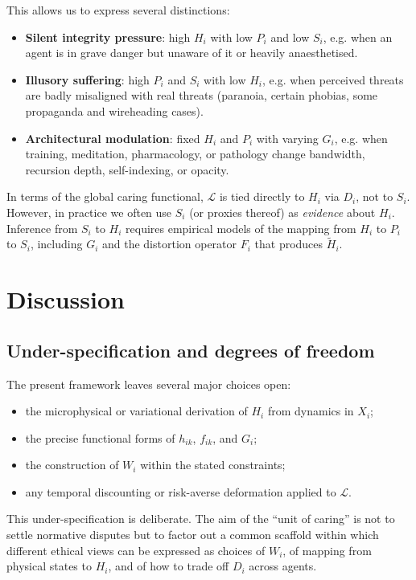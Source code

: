 \documentclass[11pt]{article}
\begin{document}
This allows us to express several distinctions:
\begin{itemize}
  \item \textbf{Silent integrity pressure}: high $H_i$ with low $P_i$ and low $S_i$, e.g. when an agent is in grave danger but unaware of it or heavily anaesthetised.
  \item \textbf{Illusory suffering}: high $P_i$ and $S_i$ with low $H_i$, e.g. when perceived threats are badly misaligned with real threats (paranoia, certain phobias, some propaganda and wireheading cases).
  \item \textbf{Architectural modulation}: fixed $H_i$ and $P_i$ with varying $G_i$, e.g. when training, meditation, pharmacology, or pathology change bandwidth, recursion depth, self-indexing, or opacity.
\end{itemize}

In terms of the global caring functional, $\mathcal L$ is tied directly to $H_i$ via $D_i$, not to $S_i$. However, in practice we often use $S_i$ (or proxies thereof) as \emph{evidence} about $H_i$. Inference from $S_i$ to $H_i$ requires empirical models of the mapping from $H_i$ to $P_i$ to $S_i$, including $G_i$ and the distortion operator $F_i$ that produces $\tilde H_i$.

\section{Discussion}

\subsection{Under-specification and degrees of freedom}

The present framework leaves several major choices open:
\begin{itemize}
  \item the microphysical or variational derivation of $H_i$ from dynamics in $X_i$;
  \item the precise functional forms of $h_{ik}$, $f_{ik}$, and $G_i$;
  \item the construction of $W_i$ within the stated constraints;
  \item any temporal discounting or risk-averse deformation applied to $\mathcal L$.
\end{itemize}

This under-specification is deliberate. The aim of the ``unit of caring'' is not to settle normative disputes but to factor out a common scaffold within which different ethical views can be expressed as choices of $W_i$, of mapping from physical states to $H_i$, and of how to trade off $D_i$ across agents.
\end{document}
